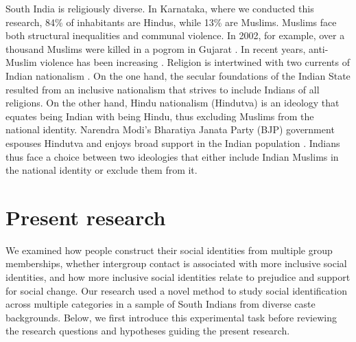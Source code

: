 \documentclass[12pt, a4paper]{article}
\begin{document}
South India is religiously diverse. In Karnataka, where we conducted this research, 84\% of inhabitants are Hindus, while 13\% are Muslims. Muslims face both structural inequalities and communal violence. In 2002, for example, over a thousand Muslims were killed in a pogrom in Gujarat \cite{dhattiwala_political_2012}. In recent years, anti-Muslim violence has been increasing \cite{amnesty_india_2017}. Religion is intertwined with two currents of Indian nationalism \cite{menski_hindu_2009}. On the one hand, the secular foundations of the Indian State resulted from an inclusive nationalism that strives to include Indians of all religions. On the other hand, Hindu nationalism (Hindutva) is an ideology that equates being Indian with being Hindu, thus excluding Muslims from the national identity. Narendra Modi's Bharatiya Janata Party (BJP) government espouses Hindutva and enjoys broad support in the Indian population \cite{pew_three_2017}. Indians thus face a choice between two ideologies that either include Indian Muslims in the national identity or exclude them from it.

\section{Present research}

We examined how people construct their social identities from multiple group memberships, whether intergroup contact is associated with more inclusive social identities, and how more inclusive social identities relate to prejudice and support for social change. Our research used a novel method to study social identification across multiple categories in a sample of South Indians from diverse caste backgrounds. Below, we first introduce this experimental task before reviewing the research questions and hypotheses guiding the present research.
\end{document}
